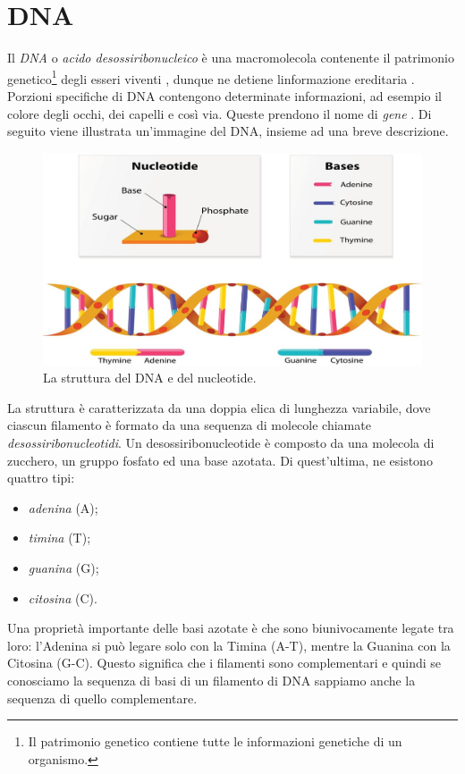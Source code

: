 \section{DNA}
Il \textit{DNA} o \textit{acido desossiribonucleico} è una macromolecola contenente il patrimonio genetico\footnote{Il patrimonio genetico contiene tutte le informazioni genetiche di un organismo.} degli esseri viventi \cite{campbellBiology}, dunque ne detiene l\?informazione ereditaria \cite{BiologySolomon}.
\newline
Porzioni specifiche di DNA contengono determinate informazioni, ad esempio il colore degli occhi, dei capelli e così via. Queste prendono il nome di \textit{gene} \cite{MolecularCellBiology}.
\newline
Di seguito viene illustrata un'immagine del DNA, insieme ad una breve descrizione.
\newline
\begin{figure}[h!]
	\includegraphics[width=\linewidth]{DNAStructure.jpg}
 	\caption{La struttura del DNA e del nucleotide.}
  	\label{fig:DnaAndNucleotideStructure}
\end{figure}
\newline
La struttura è caratterizzata da una doppia elica di lunghezza variabile, dove ciascun filamento è formato da una sequenza di molecole chiamate \textit{desossiribonucleotidi}.
\newline
Un desossiribonucleotide è composto da una molecola di zucchero, un gruppo fosfato ed una base azotata. Di quest'ultima, ne esistono quattro tipi:
\begin{itemize}
	\item \textit{adenina} (A);
	\item \textit{timina} (T);
	\item \textit{guanina} (G);
	\item \textit{citosina} (C).
\end{itemize}
Una proprietà importante delle basi azotate è che sono biunivocamente legate tra loro: l'Adenina si può legare solo con la Timina (A-T), mentre la Guanina con la Citosina (G-C). Questo significa che i filamenti sono complementari e quindi se conosciamo la sequenza di basi di un filamento di DNA sappiamo anche la sequenza di quello complementare.

